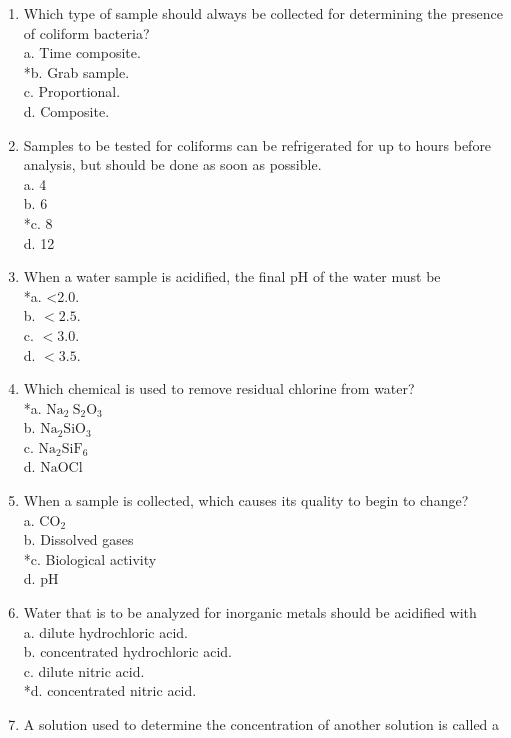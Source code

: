 \begin{enumerate}[1.]
  \item Which type of sample should always be collected for determining the presence of coliform bacteria?\\
a. Time composite.\\
*b. Grab sample.\\
c. Proportional.\\
d. Composite.\\
  \item Samples to be tested for coliforms can be refrigerated for up to hours before analysis, but should be done as soon as possible.\\
a. 4\\
b. 6\\
*c. 8\\
d. 12\\
  \item When a water sample is acidified, the final pH of the water must be\\
*a. <2.0.\\
b. $<2.5$.\\
c. $<3.0$.\\
d. $<3.5$.\\
  \item Which chemical is used to remove residual chlorine from water?\\
*a. $\mathrm{Na}_{2} \mathrm{~S}_{2} \mathrm{O}_{3}$\\
b. $\mathrm{Na}_{2} \mathrm{SiO}_{3}$\\
c. $\mathrm{Na}_{2} \mathrm{SiF}_{6}$\\
d. $\mathrm{NaOCl}$\\
  \item When a sample is collected, which causes its quality to begin to change?\\
a. $\mathrm{CO}_{2}$\\
b. Dissolved gases\\
*c. Biological activity\\
d. pH\\

  \item Water that is to be analyzed for inorganic metals should be acidified with\\
a. dilute hydrochloric acid.\\
b. concentrated hydrochloric acid.\\
c. dilute nitric acid.\\
*d. concentrated nitric acid. 

\item A solution used to determine the concentration of another solution is called a\\


\end{enumerate}
